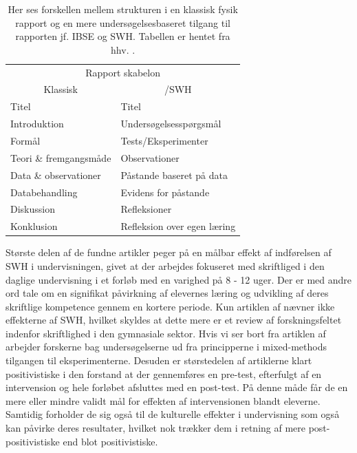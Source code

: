 \begin{table}
	\centering
	\caption{ Her ses forskellen mellem strukturen i en klassisk fysik rapport og en mere undersøgelsesbaseret tilgang til rapporten jf. IBSE og SWH. Tabellen er hentet fra hhv. 
	\citet{Burke2005, Keys1999}.}
	\label{tbl:2.1}
	\begin{tabular}{@{ } l l @{ }}
		\toprule[2.5pt]
			\multicolumn{2}{c}{Rapport skabelon}\\
			\multicolumn{1}{c}{Klassisk} & \multicolumn{1}{c}{\ib{}/SWH}\\
		\midrule[1.25pt]
			Titel				&	Titel\\
			Introduktion			&	Undersøgelsesspørgsmål\\
			Formål			& 	Tests/Eksperimenter\\
			Teori \& fremgangsmåde		&	Observationer\\
			Data \& observationer	&	Påstande baseret på data\\
			Databehandling		&	Evidens for påstande\\
			Diskussion			&	Refleksioner\\
			Konklusion			&	Refleksion over egen læring\\
		\bottomrule[2.5pt]
	\end{tabular}
\end{table}

Største delen af de fundne artikler peger på en målbar effekt af indførelsen af SWH i undervisningen, givet at der arbejdes fokuseret med skriftliged i den daglige undervisning i et forløb med en varighed på 8 - 12 uger. Der er med andre ord tale om en signifikat påvirkning af elevernes læring og udvikling af deres skriftlige kompetence gennem en kortere periode. Kun artiklen af \citep{Miller2018} nævner ikke effekterne af SWH, hvilket skyldes at dette mere er et review af forskningsfeltet indenfor skriftlighed i den gymnasiale sektor. Hvis vi ser bort fra artiklen af \citep{Miller2018, Dolin2014, Krogh2016} arbejder forskerne bag undersøgelserne ud fra principperne i mixed-methods tilgangen til eksperimenterne. Desuden er størstedelen af artiklerne klart positivistiske i den forstand at der gennemføres en pre-test, efterfulgt af en intervension og hele forløbet afsluttes med en post-test. På denne måde får de en mere eller mindre validt mål for effekten af intervensionen blandt eleverne. Samtidig forholder de sig også til de kulturelle effekter i undervisning som også kan påvirke deres resultater, hvilket nok trækker dem i retning af mere post-positivistiske end blot positivistiske.


